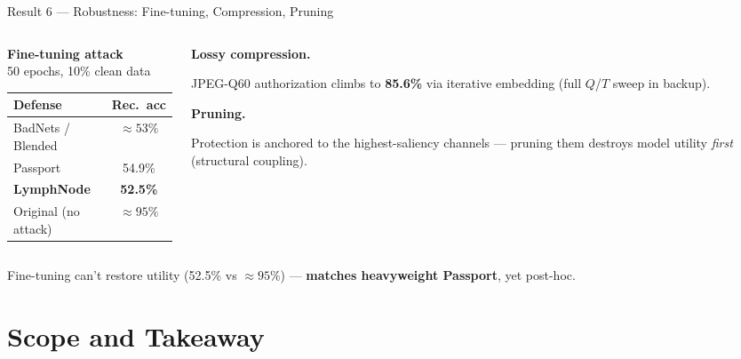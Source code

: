 \documentclass{beamer}
\begin{document}
\begin{frame}{Result 6 --- Robustness: Fine-tuning, Compression, Pruning}
    \footnotesize
    \begin{columns}[T,totalwidth=\textwidth]
        \begin{column}{0.5\textwidth}
            \centering\textbf{Fine-tuning attack}\\{\scriptsize 50 epochs, 10\% clean data}\\[4pt]
            {\scriptsize
            \setlength{\tabcolsep}{7pt}\renewcommand{\arraystretch}{1.3}
            \begin{tabular}{lc}
                \toprule
                Defense & Rec.\ acc \\
                \midrule
                BadNets / Blended & ${\approx}53\%$ \\
                Passport          & 54.9\% \\
                \textbf{LymphNode} & \textbf{52.5\%} \\
                \midrule
                Original (no attack) & ${\approx}95\%$ \\
                \bottomrule
            \end{tabular}}
        \end{column}
        \begin{column}{0.46\textwidth}
            \textbf{Lossy compression.}\par
            JPEG-Q60 authorization climbs to \textbf{85.6\%} via iterative embedding (full $Q$/$T$ sweep in backup).
            \par\vspace{0.3cm}
            \textbf{Pruning.}\par
            Protection is anchored to the highest-saliency channels --- pruning them destroys model utility \emph{first} (structural coupling).
        \end{column}
    \end{columns}
    \vspace{0.25cm}
    \centering\footnotesize Fine-tuning can't restore utility (52.5\% vs ${\approx}95\%$) --- \textbf{matches heavyweight Passport}, yet post-hoc.
\end{frame}

\section{Scope and Takeaway}
\end{document}
